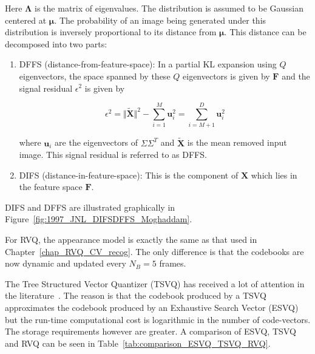 Here $\mathbf{\Lambda}$ is the matrix of eigenvalues.  The distribution is assumed to be Gaussian centered at $\mathbf{\mu}$.  The probability of an image being generated under this distribution is inversely proportional to its distance from $\mathbf{\mu}$.  This distance can be decomposed into two parts:

\begin{enumerate}
\item DFFS (distance-from-feature-space):  In a partial KL expansion using $Q$ eigenvectors, the space spanned by these $Q$ eigenvectors is given by $\mathbf{F}$ and the signal residual $\epsilon^2$ is given by

\begin{equation}
\epsilon^2 = \Vert \tilde{\mathbf{X}} \Vert^2 - \sum\limits_{i=1}^M \mathbf{u}_i^2 = \sum\limits_{i=M+1}^D \mathbf{u}_i^2
\end{equation}

where $\mathbf{u}_i$ are the eigenvectors of $\Sigma\Sigma^T$ and $\tilde{\mathbf{X}}$ is the mean removed input image.  This signal residual is referred to as DFFS.
\item DIFS (distance-in-feature-space):  This is the component of $\mathbf{X}$ which lies in the feature space $\mathbf{F}$.  
\end{enumerate}

DIFS and DFFS are illustrated graphically in Figure~\ref{fig:1997_JNL_DIFSDFFS_Moghaddam}.  

%
%

For RVQ, the appearance model is exactly the same as that used in Chapter~\ref{chap_RVQ_CV_recog}.  The only difference is that the codebooks are now dynamic and updated every $N_B=5$ frames. 


The Tree Structured Vector Quantizer (TSVQ) has received a lot of attention in the literature~\cite{1991_BOOK_VQ_GershoGray}.  The reason is that the codebook produced by a TSVQ approximates the codebook produced by an Exhaustive Search Vector (ESVQ) but the run-time computational cost is logarithmic in the number of code-vectors.  The storage requirements however are greater.  A comparison of ESVQ, TSVQ and RVQ can be seen in Table~\ref{tab:comparison_ESVQ_TSVQ_RVQ}.

